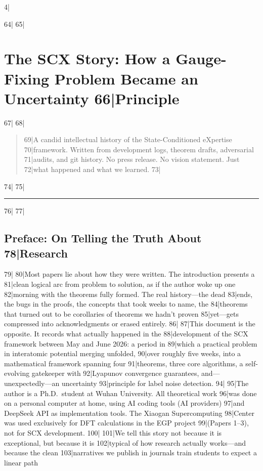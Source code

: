 4|\documentclass[
5|  12pt,
6|]{article}
\begin{document}
64|
65|\section{The SCX Story: How a Gauge-Fixing Problem Became an Uncertainty
66|Principle}\label{the-scx-story-how-a-gauge-fixing-problem-became-an-uncertainty-principle}
67|
68|\begin{quote}
69|A candid intellectual history of the State-Conditioned eXpertise
70|framework. Written from development logs, theorem drafts, adversarial
71|audits, and git history. No press release. No vision statement. Just
72|what happened and what we learned.
73|\end{quote}
74|
75|\begin{center}\rule{0.5\linewidth}{0.5pt}\end{center}
76|
77|\subsection{Preface: On Telling the Truth About
78|Research}\label{preface-on-telling-the-truth-about-research}
79|
80|Most papers lie about how they were written. The introduction presents a
81|clean logical arc from problem to solution, as if the author woke up one
82|morning with the theorems fully formed. The real history---the dead
83|ends, the bugs in the proofs, the concepts that took weeks to name, the
84|theorems that turned out to be corollaries of theorems we hadn't proven
85|yet---gets compressed into acknowledgments or erased entirely.
86|
87|This document is the opposite. It records what actually happened in the
88|development of the SCX framework between May and June 2026: a period in
89|which a practical problem in interatomic potential merging unfolded,
90|over roughly five weeks, into a mathematical framework spanning four
91|theorems, three core algorithms, a self-evolving gatekeeper with
92|Lyapunov convergence guarantees, and---unexpectedly---an uncertainty
93|principle for label noise detection.
94|
95|The author is a Ph.D.~student at Wuhan University. All theoretical work
96|was done on a personal computer at home, using AI coding tools (AI providers)
97|and DeepSeek API as implementation tools. The Xiaogan Supercomputing
98|Center was used exclusively for DFT calculations in the EGP project
99|(Papers 1--3), not for SCX development.
100|
101|We tell this story not because it is exceptional, but because it is
102|typical of how research actually works---and because the clean
103|narratives we publish in journals train students to expect a linear path
\end{document}
